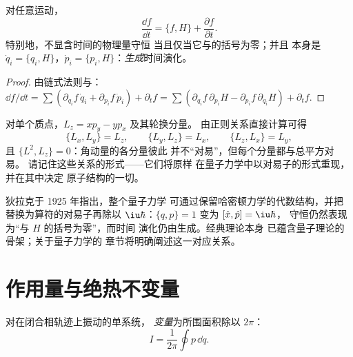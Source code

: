 \begin{theorem}[以括号表示的演化]\label{thm:b3:hamiltonian-mechanics:evolution}
对任意运动，
\[
\frac{\dd f}{\dd t} = \{f, H\} + \frac{\partial f}{\partial t} .
\]
特别地，不显含时间的物理量守恒
当且仅当它与的括号为零；并且
本身是 $\dot q_i = \{q_i, H\}$，$\dot p_i
= \{p_i, H\}$：\emph{生成}时间演化。
\end{theorem}

\begin{proof}
由链式法则与：$\dd f/\dd t = \sum(
\partial_{q_i}f\,\dot q_i + \partial_{p_i}f\,\dot p_i) + \partial_tf =
\sum(\partial_{q_i}f\,\partial_{p_i}H - \partial_{p_i}f\,
\partial_{q_i}H) + \partial_tf$.
\end{proof}

\begin{example}[角动量的括号]\label{ex:b3:hamiltonian-mechanics:brackets}
对单个质点，$L_z = xp_y - yp_x$ 及其轮换分量。
由正则关系直接计算可得
\[
\{L_x, L_y\} = L_z , \qquad
\{L_y, L_z\} = L_x , \qquad
\{L_z, L_x\} = L_y ,
\]
且 $\{L^2, L_z\} = 0$：角动量的各分量彼此
并不“对易”，但每个分量都与总平方对易。
请记住这些关系的形式——它们将原样
在量子力学中以对易子的形式重现，并在其中决定
原子结构的一切。
\end{example}

\begin{remark}[通往量子力学的门户]\label{rem:b3:hamiltonian-mechanics:doorway}
狄拉克于 1925 年指出，整个量子力学
可通过保留哈密顿力学的代数结构，并把
替换为算符的对易子再除以
$\iu\hbar$：$\{q, p\} = 1$ 变为 $[\hat x, \hat p] = \iu\hbar$，
守恒仍然表现为“与 $H$ 的括号为零”，而时间
演化仍由生成。经典理论本身
已蕴含量子理论的骨架；关于量子力学的
章节将明确阐述这一对应关系。
\end{remark}

\section{作用量与绝热不变量}

\begin{definition}[作用量变量]\label{def:b3:hamiltonian-mechanics:action-variable}
对在闭合相轨迹上振动的单系统，
\emph{变量}为所围面积除以
$2\pi$：
\[
I = \frac{1}{2\pi}\oint p\,\dd q .
\]
\end{definition}


